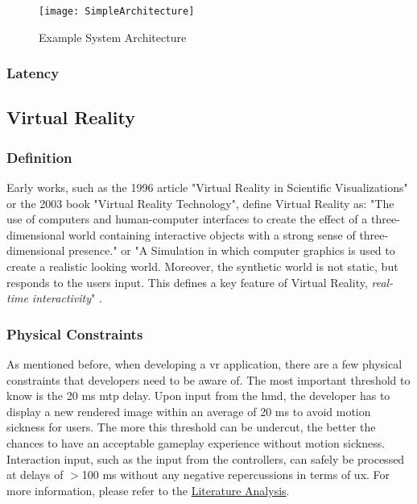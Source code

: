 \begin{figure}[h]
\caption{Example System Architecture}
\texttt{[image: SimpleArchitecture]}
\end{figure}

\subsubsection{Latency}

\subsection{Virtual Reality}

\subsubsection{Definition}
Early works, such as the 1996 article "Virtual Reality in Scientific Visualizations"  or the 2003 book "Virtual Reality Technology", define Virtual Reality as: "The use of computers and human\hyp{}computer interfaces to create the effect of a three\hyp{}dimensional world containing interactive objects with a strong sense of three\hyp{}dimensional presence."\parencite{vrsv} or "A Simulation in which computer graphics is used to create a realistic looking world. Moreover, the synthetic world is not static, but responds to the users input. This defines a key feature of Virtual Reality, \textit{real\hyp{}time interactivity}" \parencite{vrtech}.

\subsubsection{Physical Constraints}

As mentioned before, when developing a \acrshort{vr} application, there are a few physical constraints that developers need to be aware of. The most important threshold to know is the 20 \acrshort{ms} \acrfull{mtp} delay. Upon input from the \acrfull{hmd}, the developer has to display a new rendered image within an average of 20 \acrshort{ms} to avoid motion sickness for users. The more this threshold can be undercut, the better the chances to have an acceptable gameplay experience without motion sickness. Interaction input, such as the input from the controllers, can safely be processed at delays of $>$100 \acrshort{ms} without any negative repercussions in terms of \acrfull{ux}. For more information, please refer to the \hyperref[sec:lit]{Literature Analysis}.